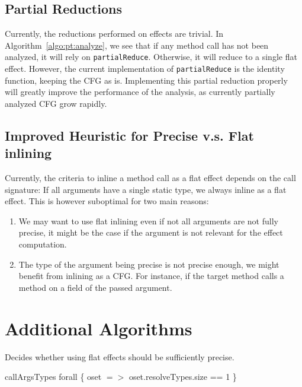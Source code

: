 \documentclass[a4paper]{article}
\begin{document}
\subsection{Partial Reductions}
Currently, the reductions performed on effects are trivial. In
Algorithm~\ref{algo:pt:analyze}, we see that if any method call has not been
analyzed, it will rely on \verb=partialReduce=. Otherwise, it will reduce to a
single flat effect. However, the current implementation of \verb=partialReduce=
is the identity function, keeping the CFG as is. Implementing this partial
reduction properly will greatly improve the performance of the analysis, as
currently partially analyzed CFG grow rapidly.

\subsection{Improved Heuristic for Precise v.s. Flat inlining}
Currently, the criteria to inline a method call as a flat effect depends on the
call signature: If all arguments have a single static type, we always inline as
a flat effect. This is however suboptimal for two main reasons:
\begin{enumerate}
    \item We may want to use flat inlining even if not all arguments are not fully
precise, it might be the case if the argument is not relevant for the effect
computation.
    \item The type of the argument being precise is not precise enough, we might
benefit from inlining as a CFG. For instance, if the target method calls a
method on a field of the passed argument.
\end{enumerate}

\newpage
\appendix
\section{Additional Algorithms}

\begin{algorithm}
\caption{Decides whether using flat effects should be sufficiently
precise.}\label{algo:pt:shouldwe}
\begin{algorithmic}[1]
    \State \Return callArgsTypes forall \{ oset $=>$ oset.resolveTypes.size == 1 \}
\EndFunction
\end{algorithmic}
\end{algorithm}
\end{document}
